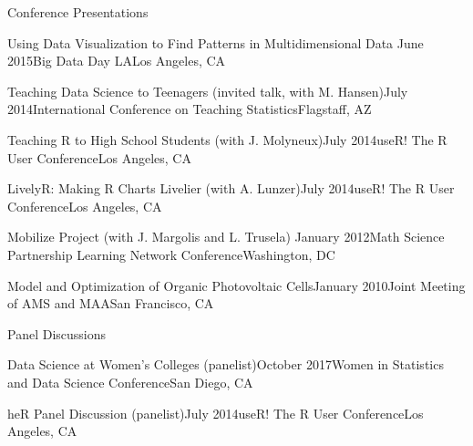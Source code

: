 \documentclass{resume} %
\begin{document}
\begin{rSection}{Conference Presentations}
\begin{sSubsection}{Using Data Visualization to Find Patterns in Multidimensional Data}{ }{June 2015}{Big Data Day LA}{Los Angeles, CA}
\end{sSubsection}

\begin{sSubsection}{Teaching Data Science to Teenagers}{ (invited talk, with M. Hansen)}{July 2014}{International Conference on Teaching Statistics}{Flagstaff, AZ}
\end{sSubsection}

\begin{sSubsection}{Teaching R to High School Students}{ (with J. Molyneux)}{July 2014}{useR! The R User Conference}{Los Angeles, CA}
\end{sSubsection}

\begin{sSubsection}{LivelyR: Making R Charts Livelier}{ (with A. Lunzer)}{July 2014}{useR! The R User Conference}{Los Angeles, CA}
\end{sSubsection}

\begin{sSubsection}{Mobilize Project}{ (with J. Margolis and L. Trusela)} {January 2012}{Math Science Partnership Learning Network Conference}{Washington, DC}
\end{sSubsection}

\begin{sSubsection}{Model and Optimization of Organic Photovoltaic Cells}{}{January 2010}{Joint Meeting of AMS and MAA}{San Francisco, CA}
\end{sSubsection}
\end{rSection}

\begin{rSection}{Panel Discussions}

\begin{sSubsection}{Data Science at Women's Colleges}{ (panelist)}{October 2017}{Women in Statistics and Data Science Conference}{San Diego, CA}
\end{sSubsection}

\begin{sSubsection}{heR Panel Discussion}{ (panelist)}{July 2014}{useR! The R User Conference}{Los Angeles, CA}
\end{sSubsection}


\end{rSection}
\end{document}
